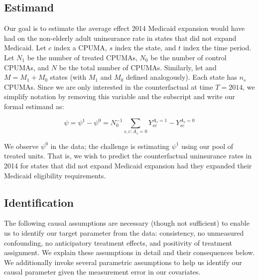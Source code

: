 \documentclass[aoas]{imsart}
\theoremstyle{plain}
\theoremstyle{remark}
\begin{document}
\subsection{Estimand}

Our goal is to estimate the average effect 2014 Medicaid expansion would have had on the non-elderly adult uninsurance rate in states that did not expand Medicaid. Let $c$ index a CPUMA, $s$ index the state, and $t$ index the time period. Let $N_1$ be the number of treated CPUMAs, $N_0$ be the number of control CPUMAs, and $N$ be the total number of CPUMAs. Similarly, let and $M = M_1 + M_0$ states (with $M_1$ and $M_0$ defined analogously). Each state has $n_s$ CPUMAs. Since we are only interested in the counterfactual at time $T = 2014$, we simplify notation by removing this variable and the subscript and write our formal estimand as:

$$
\psi = \psi^1 - \psi^0 = N_0^{-1}\sum_{s, c: A_s = 0} Y_{sc}^{A_s = 1} - Y_{sc}^{A_s = 0}
$$

We observe $\psi^0$ in the data; the challenge is estimating $\psi^1$ using our pool of treated units. That is, we wish to predict the counterfactual uninsurance rates in 2014 for states that did not expand Medicaid expansion had they expanded their Medicaid eligibility requirements.  

\subsection{Identification}

The following causal assumptions are necessary (though not sufficient) to enable us to identify our target parameter from the data: consistency, no unmeasured confounding, no anticipatory treatment effects, and positivity of treatment assignment. We explain these assumptions in detail and their consequences below. We additionally invoke several parametric assumptions to help us identify our causal parameter given the measurement error in our covariates.
\end{document}
